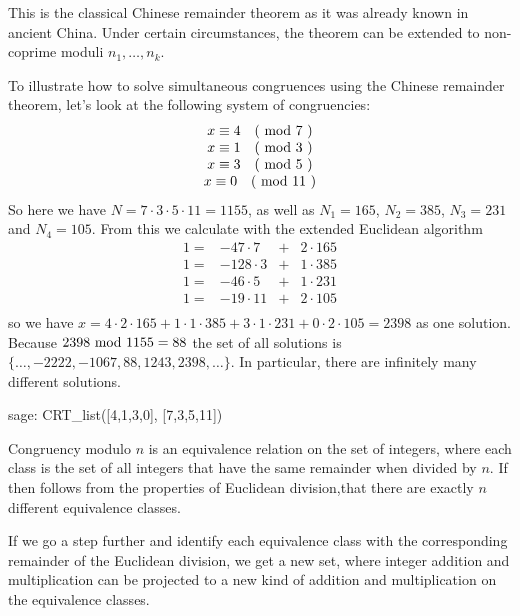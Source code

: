 \begin{remark}
This is the classical Chinese remainder theorem as it was already known in ancient China. Under certain circumstances, the theorem can be extended to non-coprime moduli $ n_1, \ldots, n_k $.
\end{remark}
\begin{example} To illustrate how to solve simultaneous congruences using the Chinese remainder theorem, let's look at the following system of congruencies:
$$
\begin{array}{c}
x \equiv 4 \quad \text{( mod } 7 \text{ )} \\
x \equiv 1 \quad \text{( mod } 3 \text{ )} \\
x \equiv 3 \quad \text{( mod } 5 \text{ )} \\
x \equiv 0 \quad \text{( mod } 11 \text{ )} \\
\end{array}
$$
So here we have $ N = 7 \cdot 3 \cdot 5 \cdot 11 = 1155 $, as well as
$ N_1 = 165 $, $ N_2 = 385 $, $ N_3 = 231 $ and $ N_4 = 105 $. From this we calculate with the extended Euclidean algorithm
$$
\begin{array}{cccc}
 1 = & -47 \cdot 7 & + & 2 \cdot 165 \\
 1 = & -128 \cdot 3 & + & 1 \cdot 385 \\
 1 = & -46 \cdot 5 & + & 1 \cdot 231 \\
 1 = & -19 \cdot 11 & + & 2 \cdot 105 \\
\end{array}
$$
so we have
$x = 4 \cdot 2 \cdot 165 + 1 \cdot 1 \cdot 385 + 3 \cdot 1 \cdot 231 + 0 \cdot 2 \cdot 105 = 2398$
as one solution. Because $ 2398 \text{ mod } 1155 = 88 $ the set of all solutions is
$ \{\ldots, -2222, -1067,88,1243, 2398, \ldots \} $. In particular, there are infinitely many different solutions.

\begin{sagecommandline}
sage: CRT_list([4,1,3,0], [7,3,5,11])
\end{sagecommandline}
\end{example}

Congruency modulo $ n $ is an equivalence relation on the set of integers, where each class is the set of all integers that have the same remainder when divided by $n$. If then follows from the properties of Euclidean division,that there are exactly $ n $ different equivalence classes. 

If we go a step further and identify each equivalence class with the corresponding remainder of the Euclidean division, we get a new set, where integer addition and multiplication can be projected to a new kind of addition and multiplication on the equivalence classes. 

